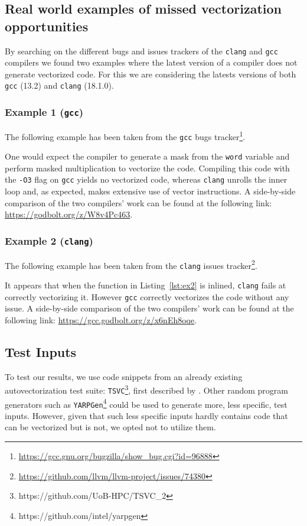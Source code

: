 \documentclass[acmsmall,review, nonacm]{acmart}
\begin{document}
\subsection{Real world examples of missed vectorization opportunities} \label{examples}
By searching on the different bugs and issues trackers of the \texttt{clang} and \texttt{gcc} 
compilers we found two examples where the latest version of a compiler does not 
generate vectorized code. For this we are considering the latests versions of 
both \texttt{gcc} (13.2) and \texttt{clang} (18.1.0).

\subsubsection{Example 1 (\texttt{gcc})}
The following example has been taken from the \texttt{gcc} bugs tracker\footnote{\url{https://gcc.gnu.org/bugzilla/show_bug.cgi?id=96888}}.

One would expect the compiler to generate a mask from the \texttt{word} variable 
and perform masked multiplication to vectorize the code.
Compiling this code with the \texttt{-O3} flag on \texttt{gcc} yields no vectorized code, whereas \texttt{clang} unrolls the inner loop and, 
as expected, makes extensive use of vector instructions. A side-by-side comparison of the two compilers' work can be found 
at the following link: \url{https://godbolt.org/z/W8v4Pc463}.
% 

\subsubsection{Example 2 (\texttt{clang})}
The following example has been taken from the \texttt{clang} issues tracker\footnote{\url{https://github.com/llvm/llvm-project/issues/74380}}.

It appears that when the function in Listing~\ref{lst:ex2} is inlined, \texttt{clang} fails at correctly vectorizing it. However
\texttt{gcc} correctly vectorizes the code without any issue.
A side-by-side comparison of the two compilers' work can be found 
at the following link: \url{https://gcc.godbolt.org/z/x6nEh8oqe}.

\subsection{Test Inputs}
To test our results, we use code snippets from an already existing autovectorization test suite: \texttt{TSVC}\footnote{https://github.com/UoB-HPC/TSVC\_2}, first described by \citet{Callahan88}.
Other random program generators such as \texttt{YARPGen}\footnote{https://github.com/intel/yarpgen} could be used to generate more, less specific, test inputs.
However, given that such less specific inputs hardly contains code that can be vectorized but is not, we opted not to utilize them.
\end{document}
